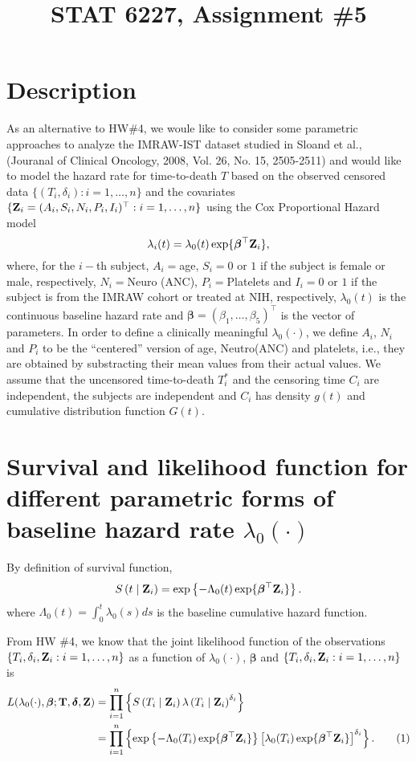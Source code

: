 \documentclass[11pt]{article}
\newcommand{\numit}{\stepcounter{equation}\tag{\theequation}}
\newcommand{\cS}[1]{S \left( #1 \mid \bZ_i \right)}
\newcommand{\clamb}[1]{\lambda \left( #1 \mid \bZ_i \right)}
\newcommand{\bT}{{\bf{T}}}
\newcommand{\bZ}{{\bf{Z}}}
\newcommand{\bdelta}{{\bm \delta}}
\newcommand{\bbeta}{{\bm \beta}}
\begin{document}
\title{STAT 6227, Assignment \#5}
\maketitle

\section{Description}
As an alternative to HW\#4, we woule like to consider some parametric approaches
to analyze the IMRAW-IST dataset studied in Sloand et al., (Jouranal of
Clinical Oncology, 2008, Vol. 26, No. 15, 2505-2511) and would like to model the
hazard rate for time-to-death $T$ based on the observed censored data
$\{(T_i,\delta_i):i=1,\dots,n\}$ and the covariates $\{\bZ_i =
(A_i,S_i,N_i,P_i,I_i)^{\top}:i=1,\dots,n\}$ using the Cox Proportional Hazard
model
\begin{equation}
\label{eq:CoxPH}
\lambda_i(t) = \lambda_0(t)\exp\{\bbeta^{\top}\bZ_i\},
\end{equation}
where, for the $i-$th subject, $A_i=$age, $S_i=0$ or $1$ if the subject is
female or male, respectively, $N_i=$Neuro (ANC), $P_i=$Platelets and $I_i=0$ or
$1$ if the subject is from the IMRAW cohort or treated at NIH, respectively,
$\lambda_0(t)$ is the continuous baseline hazard rate and $\bbeta =
(\beta_1,\dots,\beta_5)^{\top}$ is the vector of parameters.
In order to define a clinically meaningful $\lambda_0(\cdot)$, we define $A_i$,
$N_i$ and $P_i$ to be the ``centered'' version of age, Neutro(ANC) and platelets, i.e.,
they are obtained by substracting their mean values from their actual values.
We assume that the uncensored time-to-death $T_i^{*}$ and the censoring time $C_i$ are independent,
the subjects are independent and $C_i$ has density $g(t)$ and cumulative
distribution function $G(t)$.

\section{Survival and likelihood function for different parametric forms of baseline hazard rate $\lambda_{0}(\cdot)$}
By definition of survival function, 
\begin{equation}
\label{eq:SurvFunc}
\cS{t} = \exp \left\{ -\Lambda_0(t) \exp\{\bbeta^{\top}\bZ_i\} \right\}.
\end{equation}
where $\Lambda_0(t) = \int_0^t \lambda_0(s)ds$ is the baseline cumulative hazard function.

From HW \#4, we know that the joint likelihood function of the observations
$\{T_i, \delta_i,\bZ_i:i=1,\dots,n\}$ as a function of $\lambda_0(\cdot)$,
$\bbeta$ and $\{T_i, \delta_i,\bZ_i:i=1,\dots,n\}$ is
\begin{align*}
L(\lambda_0(\cdot),\bbeta;\bT,\bdelta,\bZ) &= \prod_{i=1}^n \left\{ \cS{T_i}\clamb{T_i}^{\delta_i} \right\}\\
  &= \prod_{i=1}^n \left\{\exp \left\{ -\Lambda_0(T_i) \exp\{\bbeta^{\top}\bZ_i\} \right\} \left[ \lambda_0(T_i)\exp\{\bbeta^{\top}\bZ_i\} \right]^{\delta_i} \right\}.
  \numit\label{eq:Lik}
\end{align*}
\end{document}
